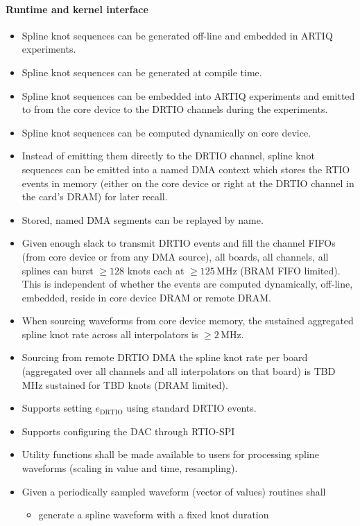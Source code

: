 \documentclass[english]{article}
\begin{document}
\paragraph{Runtime and kernel interface}
\begin{itemize}
	\item Spline knot sequences can be generated off-line and embedded in ARTIQ experiments.
	\item Spline knot sequences can be generated at compile time.
	\item Spline knot sequences can be embedded into ARTIQ experiments and emitted to from the core device to the DRTIO channels during the experiments.
	\item Spline knot sequences can be computed dynamically on core device.
	\item Instead of emitting them directly to the DRTIO channel, spline knot sequences can be emitted into a named DMA context which stores the RTIO events in memory (either on the core device or right at the DRTIO channel in the card's DRAM) for later recall.
	\item Stored, named DMA segments can be replayed by name.
	\item Given enough slack to transmit DRTIO events and fill the channel FIFOs (from core device or from any DMA source), all boards, all channels, all splines can burst $\geq128$ knots each at $\geq125$\,MHz (BRAM FIFO limited). This is independent of whether the events are computed dynamically, off-line, embedded, reside in core device DRAM or remote DRAM.
	\item When sourcing waveforms from core device memory, the sustained aggregated spline knot rate across all interpolators is $\geq2$\,MHz.
	\item Sourcing from remote DRTIO DMA the spline knot rate per board (aggregated over all channels and all interpolators on that board) is TBD MHz sustained for TBD knots (DRAM limited).
	\item Supports setting $e_\mathrm{DRTIO}$ using standard DRTIO events.
	\item Supports configuring the DAC through RTIO-SPI
	\item Utility functions shall be made available to users for processing spline waveforms (scaling in value and time, resampling).
	\item Given a periodically sampled waveform (vector of values) routines shall
	\begin{itemize}
		\item generate a spline waveform with a fixed knot duration 

\end{itemize}
\end{itemize}
\end{document}
